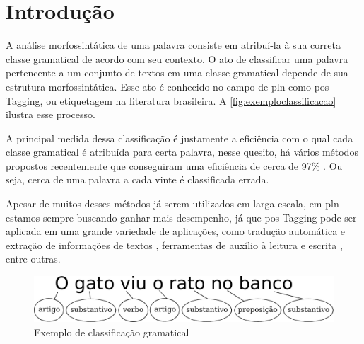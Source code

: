 \chapter{Introdução}\label{introducao}

A análise morfossintática de uma palavra consiste em atribuí-la à sua correta classe gramatical de acordo com seu contexto. O ato de classificar uma palavra pertencente a um conjunto de textos em uma classe gramatical depende de sua estrutura morfossintática. Esse ato é conhecido no campo de \ac{pln} como \ac{pos} Tagging, ou etiquetagem na literatura brasileira. A \autoref{fig:exemploclassificacao} ilustra esse processo. 


A principal medida dessa classificação é justamente a eficiência com o qual cada classe gramatical é atribuída para certa palavra, nesse quesito, há vários métodos propostos recentemente que conseguiram uma eficiência de cerca de 97\% \cite{dos2014training, collobert2011deep, fonseca2015evaluating}. Ou seja, cerca de uma palavra a cada vinte é classificada errada. 

Apesar de muitos desses métodos já serem utilizados em larga escala, em \ac{pln} estamos sempre buscando ganhar mais desempenho, já que \ac{pos} Tagging pode ser aplicada em uma grande variedade de aplicações, como tradução automática e extração de informações de textos \cite{manning1999foundations}, ferramentas de auxílio à leitura e escrita \cite{marquiafavel2010processo}, entre outras.

\begin{figure}[htb]
  \caption{Exemplo de classificação gramatical}\label{fig:exemploclassificacao}
  \begin{center}
      \includegraphics[scale=0.75]{img/exemploclassificacao.pdf}
  \end{center}
\end{figure}

